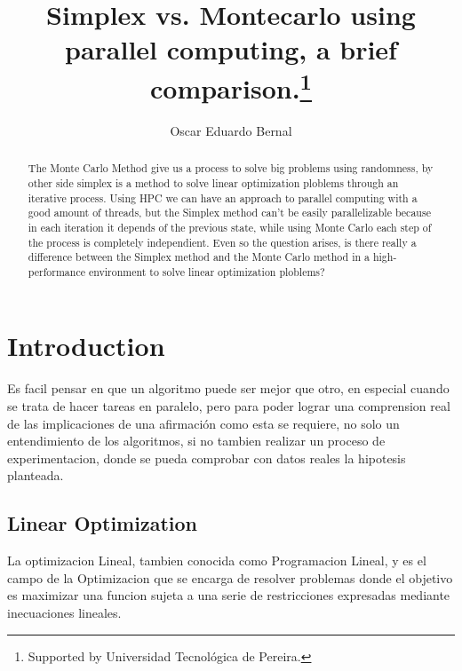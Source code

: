 \documentclass[runningheads]{llncs}
\begin{document}
%
\title{Simplex vs. Montecarlo using parallel computing, a brief comparison.\thanks{Supported by Universidad Tecnológica de Pereira.}}
%
%
\author{Oscar Eduardo Bernal}
%
%
%
\maketitle              %
%
\begin{abstract}
The Monte Carlo Method give us a process to solve big problems using randomness, by other side simplex is a method to solve linear optimization ploblems through an iterative process. Using HPC we can have an approach to parallel computing with a good amount of threads, but the Simplex method can't be easily parallelizable because in each iteration it depends of the previous state, while using Monte Carlo each step of the process is completely independient. Even so the question arises, is there really a difference between the Simplex method and the Monte Carlo method in a high-performance environment to solve linear optimization ploblems?

\end{abstract}
%
%
%
\section{Introduction}
Es facil pensar en que un algoritmo puede ser mejor que otro, en especial cuando se trata de hacer tareas en paralelo, pero para poder lograr una comprension real de las implicaciones de una afirmación como esta se requiere, no solo un entendimiento de los algoritmos, si no tambien realizar un proceso de experimentacion, donde se pueda comprobar con datos reales la hipotesis planteada.

\subsection{Linear Optimization}
La optimizacion Lineal, tambien conocida como Programacion Lineal, y es el campo de la Optimizacion que se encarga de resolver problemas donde el objetivo es maximizar una funcion sujeta a una serie de restricciones expresadas mediante inecuaciones lineales. 
\end{document}
